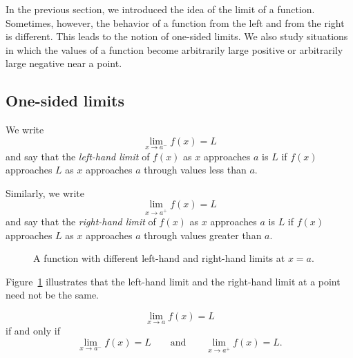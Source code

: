 In the previous section, we introduced the idea of the limit of a function. Sometimes, however, the behavior of a function from the left and from the right is different. This leads to the notion of one-sided limits. We also study situations in which the values of a function become arbitrarily large positive or arbitrarily large negative near a point.

\subsection{One-sided limits}

\begin{definition}
We write
\[
\lim_{x\to a^-}f(x)=L
\]
and say that the \emph{left-hand limit} of \(f(x)\) as \(x\) approaches \(a\) is \(L\) if \(f(x)\) approaches \(L\) as \(x\) approaches \(a\) through values less than \(a\).

Similarly, we write
\[
\lim_{x\to a^+}f(x)=L
\]
and say that the \emph{right-hand limit} of \(f(x)\) as \(x\) approaches \(a\) is \(L\) if \(f(x)\) approaches \(L\) as \(x\) approaches \(a\) through values greater than \(a\).
\end{definition}

\begin{figure}[tbp]
\centering
{}
\caption{A function with different left-hand and right-hand limits at \(x=a\).}
\label{fig:one-sided-limits}
\end{figure}

Figure~\ref{fig:one-sided-limits} illustrates that the left-hand limit and the right-hand limit at a point need not be the same.

\begin{theorem}
\[
\lim_{x\to a}f(x)=L
\]
if and only if
\[
\lim_{x\to a^-}f(x)=L
\qquad \text{and} \qquad
\lim_{x\to a^+}f(x)=L.
\]
\end{theorem}

